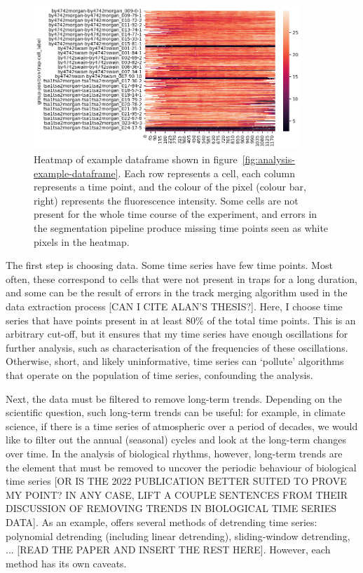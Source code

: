 \begin{figure}
  \centering
  \includegraphics[width=0.9\textwidth]{example_dataframe_heatmap}
  \caption{
    Heatmap of example dataframe shown in figure~\ref{fig:analysis-example-dataframe}.
    Each row represents a cell, each column represents a time point, and the colour of the pixel (colour bar, right) represents the fluorescence intensity.
    Some cells are not present for the whole time course of the experiment, and errors in the segmentation pipeline produce missing time points seen as white pixels in the heatmap.
  }
  \label{fig:analysis-example-heatmap}
\end{figure}

The first step is choosing data.
Some time series have few time points.
Most often, these correspond to cells that were not present in traps for a long duration, and some can be the result of errors in the track merging algorithm used in the data extraction process [CAN I CITE ALAN'S THESIS?].
Here, I choose time series that have points present in at least 80\% of the total time points.
This is an arbitrary cut-off, but it ensures that my time series have enough oscillations for further analysis, such as characterisation of the frequencies of these oscillations.
Otherwise, short, and likely uninformative, time series can `pollute' algorithms that operate on the population of time series, confounding the analysis.


Next, the data must be filtered to remove long-term trends.
Depending on the scientific question, such long-term trends can be useful:
for example, in climate science, if there is a time series of atmospheric  over a period of decades, we would like to filter out the annual (seasonal) cycles and look at the long-term changes over time.
In the analysis of biological rhythms, however, long-term trends are the element that must be removed to uncover the periodic behaviour of biological time series \parencite{zielinskiStrengthsLimitationsPeriod2014} [OR IS THE 2022 PUBLICATION BETTER SUITED TO PROVE MY POINT?  IN ANY CASE, LIFT A COUPLE SENTENCES FROM THEIR DISCUSSION OF REMOVING TRENDS IN BIOLOGICAL TIME SERIES DATA].
As an example, \textcite{zielinskiPeriodEstimationRhythm2022} offers several methods of detrending time series: polynomial detrending (including linear detrending), sliding-window detrending, ... [READ THE PAPER AND INSERT THE REST HERE].
However, each method has its own caveats.

